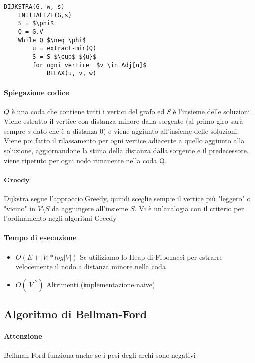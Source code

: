 \begin{lstlisting}
DIJKSTRA(G, w, s)
    INITIALIZE(G,s)
    S = $\phi$
    Q = G.V
    While Q $\neq \phi$
        u = extract-min(Q)
        S = S $\cup$ ${u}$
        for ogni vertice  $v \in Adj[u]$ 
            RELAX(u, v, w)
\end{lstlisting}

	\paragraph{Spiegazione codice}
	$Q$ è una coda che contiene tutti i vertici del grafo ed $S$ è l'insieme delle soluzioni.
	Viene estratto il vertice con distanza minore dalla sorgente (al primo giro sarà sempre $s$ dato che è
	a distanza 0) e viene aggiunto all'insieme delle soluzioni. Viene poi fatto il rilassamento per ogni vertice adiacente
	a quello aggiunto alla soluzione, aggiornandone la stima della distanza dalla sorgente e il predecessore.
	viene ripetuto per ogni nodo rimanente nella coda Q.

	\paragraph{Greedy}
	Dijkstra segue l'approccio Greedy, quindi sceglie sempre il vertice più "leggero" o "vicino" in $V \setminus  S$
	da aggiungere all'insieme $S$. Vi è un'analogia con il criterio per l'ordinamento negli algoritmi Greedy

	\paragraph{Tempo di esecuzione}
	\begin{itemize}
		\item $O(E + |V|*log|V|)$ Se utiliziamo lo Heap di Fibonacci per estrarre velocemente il nodo a distanza minore nella coda
		\item $O(|V|^2)$ Altrimenti (implementazione naive)
	\end{itemize}

	\subsection{Algoritmo di Bellman-Ford}

	\paragraph{Attenzione}
	Bellman-Ford funziona anche se i pesi degli archi sono negativi


